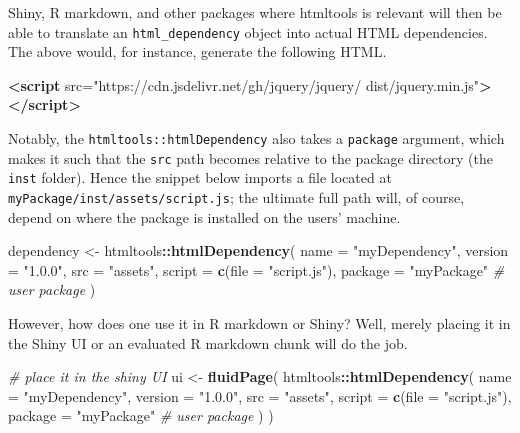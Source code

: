 \documentclass[10pt,]{krantz}
\makeatletter
\newenvironment{Shaded}{\begin{snugshade}}{\end{snugshade}}
\newcommand{\CommentTok}[1]{\textcolor[rgb]{0.37,0.37,0.37}{\textit{#1}}}
\newcommand{\DataTypeTok}[1]{\textcolor[rgb]{0.27,0.27,0.27}{#1}}
\newcommand{\KeywordTok}[1]{\textcolor[rgb]{0.27,0.27,0.27}{\textbf{#1}}}
\newcommand{\NormalTok}[1]{#1}
\newcommand{\OperatorTok}[1]{\textcolor[rgb]{0.43,0.43,0.43}{\textbf{#1}}}
\newcommand{\OtherTok}[1]{\textcolor[rgb]{0.37,0.37,0.37}{#1}}
\newcommand{\StringTok}[1]{\textcolor[rgb]{0.5,0.5,0.5}{#1}}
\newenvironment{kframe}{%
\medskip{}
\setlength{\fboxsep}{.8em}
 \def\at@end@of@kframe{}%
 \ifinner\ifhmode%
  \def\at@end@of@kframe{\end{minipage}}%
  \begin{minipage}{\columnwidth}%
 \fi\fi%
 \def\FrameCommand##1{\hskip\@totalleftmargin \hskip-\fboxsep
 \colorbox{shadecolor}{##1}\hskip-\fboxsep
     \hskip-\linewidth \hskip-\@totalleftmargin \hskip\columnwidth}%
 \MakeFramed {\advance\hsize-\width
   \@totalleftmargin\z@ \linewidth\hsize
   \@setminipage}}%
 {\par\unskip\endMakeFramed%
 \at@end@of@kframe}
\renewenvironment{Shaded}{\begin{kframe}}{\end{kframe}}
\makeatother
\begin{document}
Shiny, R markdown, and other packages where htmltools is relevant will then be able to translate an \texttt{html\_dependency} object into actual HTML dependencies. The above would, for instance, generate the following HTML.

\begin{Shaded}
\begin{Highlighting}[]
\KeywordTok{<script} 
\OtherTok{  src=}\StringTok{"https://cdn.jsdelivr.net/gh/jquery/jquery/}
\StringTok{    dist/jquery.min.js"}\KeywordTok{>}
\KeywordTok{</script>}
\end{Highlighting}
\end{Shaded}

Notably, the \texttt{htmltools::htmlDependency} also takes a \texttt{package} argument, which makes it such that the \texttt{src} path becomes relative to the package directory (the \texttt{inst} folder). Hence the snippet below imports a file located at \texttt{myPackage/inst/assets/script.js}; the ultimate full path will, of course, depend on where the package is installed on the users' machine.

\begin{Shaded}
\begin{Highlighting}[]
\NormalTok{dependency <-}\StringTok{ }\NormalTok{htmltools}\OperatorTok{::}\KeywordTok{htmlDependency}\NormalTok{(}
  \DataTypeTok{name =} \StringTok{"myDependency"}\NormalTok{,}
  \DataTypeTok{version =} \StringTok{"1.0.0"}\NormalTok{,}
  \DataTypeTok{src =} \StringTok{"assets"}\NormalTok{,}
  \DataTypeTok{script =} \KeywordTok{c}\NormalTok{(}\DataTypeTok{file =} \StringTok{"script.js"}\NormalTok{),}
  \DataTypeTok{package =} \StringTok{"myPackage"} \CommentTok{# user package}
\NormalTok{)}
\end{Highlighting}
\end{Shaded}

However, how does one use it in R markdown or Shiny? Well, merely placing it in the Shiny UI or an evaluated R markdown chunk will do the job.

\begin{Shaded}
\begin{Highlighting}[]
\CommentTok{# place it in the shiny UI}
\NormalTok{ui <-}\StringTok{ }\KeywordTok{fluidPage}\NormalTok{(}
\NormalTok{  htmltools}\OperatorTok{::}\KeywordTok{htmlDependency}\NormalTok{(}
    \DataTypeTok{name =} \StringTok{"myDependency"}\NormalTok{,}
    \DataTypeTok{version =} \StringTok{"1.0.0"}\NormalTok{,}
    \DataTypeTok{src =} \StringTok{"assets"}\NormalTok{,}
    \DataTypeTok{script =} \KeywordTok{c}\NormalTok{(}\DataTypeTok{file =} \StringTok{"script.js"}\NormalTok{),}
    \DataTypeTok{package =} \StringTok{"myPackage"} \CommentTok{# user package}
\NormalTok{  )}
\NormalTok{)}
\end{Highlighting}
\end{Shaded}
\end{document}
